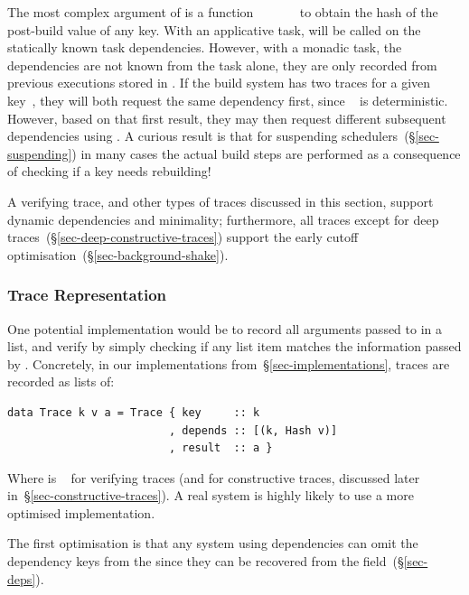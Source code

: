 The most complex argument of  is a function
~\hs{::}~~\hs{->}~~~ to obtain the
hash of the post-build value of any key. With an applicative task,
 will be called on the statically known task dependencies.
However, with a monadic task, the dependencies are not known from the task
alone, they are only recorded from previous executions stored in . If
the build system has two traces for a given key~, they will both request
the same dependency first, since ~ is deterministic. However,
based on that first result, they may then request different subsequent
dependencies using . A curious result is that for suspending
schedulers~(\S\ref{sec-suspending}) in many cases the actual build steps are
performed as a consequence of checking if a key needs rebuilding!

A verifying trace, and other types of traces discussed in this section, support
dynamic dependencies and minimality; furthermore, all traces except for deep
traces~(\S\ref{sec-deep-constructive-traces}) support the early cutoff
optimisation~(\S\ref{sec-background-shake}).

\subsubsection{Trace Representation}\label{sec-trace-representation}

One potential implementation would be to record all arguments passed to
 in a list, and verify by simply checking if any list item matches
the information passed by . Concretely, in our implementations
from~\S\ref{sec-implementations}, traces are recorded as lists of:

\vspace{1mm}
\begin{verbatim}
data Trace k v a = Trace { key     :: k
                         , depends :: [(k, Hash v)]
                         , result  :: a }
\end{verbatim}
\vspace{1mm}

\noindent
Where  is ~ for verifying traces (and  for
constructive traces, discussed later in~\S\ref{sec-constructive-traces}). A real
system is highly likely to use a more optimised implementation.

The first optimisation is that any system using  dependencies
can omit the dependency keys from the  since they can be recovered
from the  field~(\S\ref{sec-deps}).

